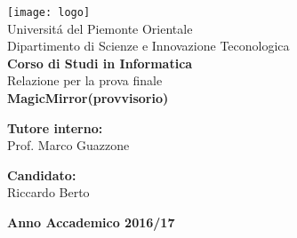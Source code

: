 \begin{titlepage}
\begin{center}
\texttt{[image: logo]}
\\[1\baselineskip]
\Large Universit\'a del Piemonte Orientale
\\[2\baselineskip]
\Large Dipartimento di Scienze e Innovazione Teconologica
\\[1\baselineskip]
\textbf{\Large Corso di Studi in Informatica}
\\[3\baselineskip]
\normalsize Relazione per la prova finale
\\[1\baselineskip]

{\LARGE \bfseries MagicMirror(provvisorio)}\\[1cm]
\vspace{3cm}
\begin{minipage}[t]{0.4\textwidth}
\flushleft
{\bf Tutore interno:}\\
Prof. Marco Guazzone\\
\end{minipage}
\begin{minipage}[t]{0.4\textwidth}
\flushright
{\bf Candidato:}\\
Riccardo Berto\\
\end{minipage}
\vfill
\vspace{3cm}
\textbf{\large Anno Accademico 2016/17}
\vfill
\end{center}
\end{titlepage}
